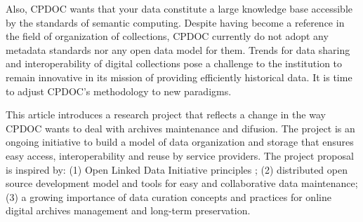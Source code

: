 Also, CPDOC wants that your data constitute a large knowledge base
accessible by the standards of semantic computing. Despite having
become a reference in the field of organization of collections, CPDOC
currently do not adopt any metadata standards nor any open data model
for them. Trends for data sharing and interoperability of digital
collections pose a challenge to the institution to remain innovative
in its mission of providing efficiently historical data. It is time to
adjust CPDOC's methodology to new paradigms.
   

      
This article introduces a research project that reflects a change in
the way CPDOC wants to deal with archives maintenance and
difusion. The project is an ongoing initiative to build a model of
data organization and storage that ensures easy access,
interoperability and reuse by service providers. The project proposal
is inspired by: (1) Open Linked Data Initiative principles \cite{odi};
(2) distributed open source development model and tools for easy and
collaborative data maintenance; (3) a growing importance of data
curation concepts and practices for online digital archives management
and long-term preservation.
   
